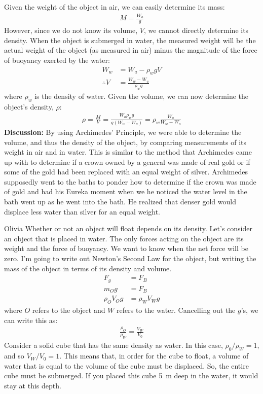 {{\begin{example}
Given the weight of the object in air, we can easily determine its mass:
\begin{align*}
M = \frac{W_a}{g}
\end{align*}
However, since we do not know its volume, $V$, we cannot directly determine its density. When the object is submerged in water, the measured weight will be the actual weight of the object (as measured in air) minus the magnitude of the force of buoyancy exerted by the water:
\begin{align*}
W_w &= W_a - \rho_w g V\\
\therefore V &= \frac{W_w -W_a}{\rho_w g}
\end{align*}
where $\rho_w$ is the density of water. Given the volume, we can now determine the object's density, $\rho$:
\begin{align*}
\rho = \frac{M}{V}=\frac{W_a\rho_w g}{g (W_w -W_a)}=\rho_w\frac{W_a}{W_w -W_a}
\end{align*}
\textbf{Discussion:} By using Archimedes' Principle, we were able to determine the volume, and thus the density of the object, by comparing measurements of its weight in air and in water. This is similar to the method that Archimedes came up with to determine if a crown owned by a general was made of real gold or if some of the gold had been replaced with an equal weight of silver. Archimedes supposedly went to the baths to ponder how to determine if the crown was made of gold and had his Eureka moment when we he noticed the water level in the bath went up as he went into the bath. He realized that denser gold would displace less water than silver for an equal weight. 
\end{example}
\vspace{-0.45cm}
\begin{studentOpinion}{Olivia}
Whether or not an object will float depends on its density. Let's consider an object that is placed in water. The only forces acting on the object are its weight and the force of buoyancy. We want to know when the net force will be zero. I'm going to write out Newton's Second Law for the object, but writing the mass of the object in terms of its density and volume.
\begin{align*}
F_g&=F_B\\
m_Og&=F_B\\
\rho_OV_Og&=\rho_WV_Wg
\end{align*}
where $O$ refers to the object and $W$ refers to the water. Cancelling out the $g$'s, we can write this as:
\begin{align*}
\frac{\rho_O}{\rho_W}=\frac{V_W}{V_0}
\end{align*}
Consider a solid cube that has the same density as water. In this case, $\rho_0/\rho_W=1$, and so $V_W/V_0=1$. This means that, in order for the cube to float, a volume of water that is equal to the volume of the cube must be displaced. So, the entire cube must be submerged. If you placed this cube \SI{5}{m} deep in the water, it would stay at this depth.


\end{studentOpinion}}}
